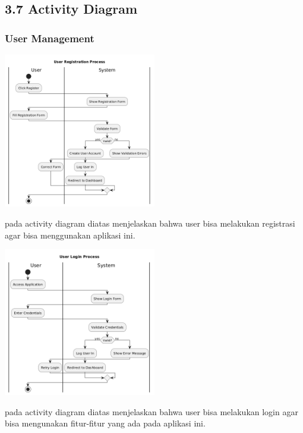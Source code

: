 \subsection*{3.7 Activity Diagram}

\subsubsection*{User Management}
\begin{center}
    \includegraphics[width=0.5\textwidth]{assets/activity_diagrams/user_register.png}
\end{center}
pada activity diagram diatas menjelaskan bahwa user bisa melakukan registrasi agar bisa menggunakan aplikasi ini.

\begin{center}
    \includegraphics[width=0.5\textwidth]{assets/activity_diagrams/user_login.png}
\end{center}
pada activity diagram diatas menjelaskan bahwa user bisa melakukan login agar bisa mengunakan fitur-fitur yang ada pada aplikasi ini.

